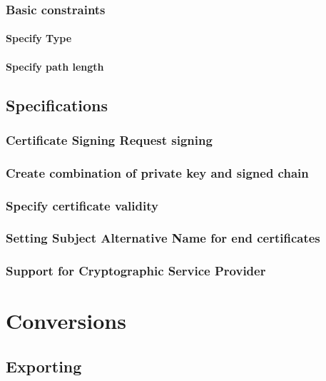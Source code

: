 \documentclass[10pt, a4paper]{report}
\begin{document}
    \subsubsection{Basic constraints}
    
      \paragraph{Specify Type}
      
      \paragraph{Specify path length}
      
  \subsection{Specifications}
  
    \subsubsection{Certificate Signing Request signing}
    
    \subsubsection{Create combination of private key and signed chain}
    
    \subsubsection{Specify certificate validity}
    
    \subsubsection{Setting Subject Alternative Name for end certificates}
    
    \subsubsection{Support for Cryptographic Service Provider}
    
\section{Conversions}

  \subsection{Exporting}
  
\end{document}
